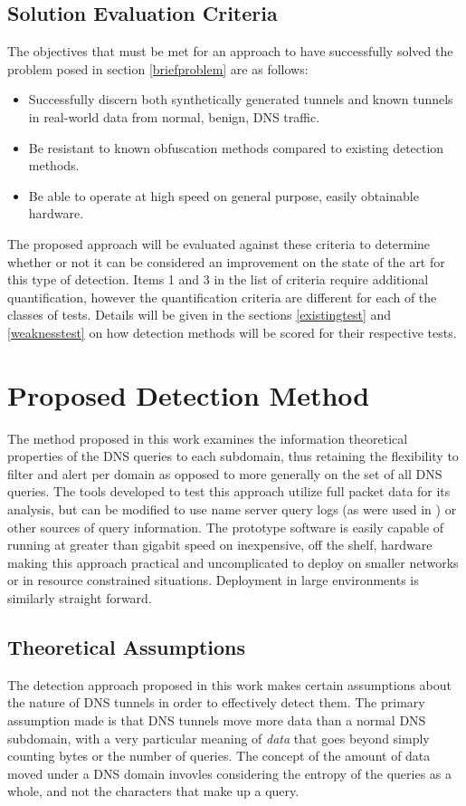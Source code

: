 \documentclass[12pt]{report}
\theoremstyle{remark}
\theoremstyle{definition}
\theoremstyle{definition}
\theoremstyle{definition}
\begin{document}
\section{Solution Evaluation Criteria}
The objectives that must be met for an approach to have successfully solved the problem posed in section \ref{briefproblem} are as follows:

\begin{itemize}
\item Successfully discern both synthetically generated tunnels and known tunnels
in real-world data from normal, benign, DNS traffic.
\item Be resistant to known obfuscation methods compared to existing detection
methods.
\item Be able to operate at high speed on general purpose, easily obtainable
hardware.
\end{itemize}

The proposed approach will be evaluated against these criteria to determine
whether or not it can be considered an improvement on the state of the art for
this type of detection. Items 1 and 3 in the list of criteria require additional quantification, however the quantification criteria are different for each of the classes of tests. Details will be given in the sections \ref{existingtest} and \ref{weaknesstest} on how detection methods will be scored for their respective tests.

\chapter{Proposed Detection Method}
\label{datameasurement}

The method proposed in this work examines the information theoretical properties of the
DNS queries to each subdomain, thus retaining the flexibility to filter and
alert per domain as opposed to more generally on the set of all DNS queries. The tools developed to test this approach utilize full packet data for its analysis, but can be modified to use name server query logs (as were used in \cite{Romana2007}) or other sources of query information. The prototype software is easily capable of running at greater than gigabit speed on inexpensive, off the shelf, hardware making this approach practical and uncomplicated to deploy on smaller networks or in resource constrained situations. Deployment in large environments is similarly straight forward.

\section{Theoretical Assumptions}
The detection approach proposed in this work makes certain assumptions about the nature of DNS tunnels in order to effectively detect them. The primary assumption made is that DNS tunnels move more data than a normal DNS subdomain, with a very particular meaning of \emph{data} that goes beyond simply counting bytes or the number of queries. The concept of the amount of data moved under a DNS domain invovles considering the entropy of the queries as a whole, and not the characters that make up a query.
\end{document}
